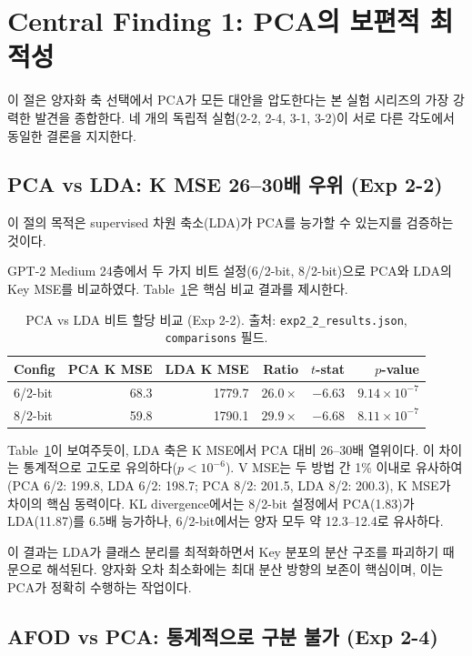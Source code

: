 \documentclass[11pt,a4paper]{article}
\begin{document}
\section{Central Finding 1: PCA의 보편적 최적성}

이 절은 양자화 축 선택에서 PCA가 모든 대안을 압도한다는 본 실험 시리즈의 가장 강력한 발견을 종합한다.
네 개의 독립적 실험(2-2, 2-4, 3-1, 3-2)이 서로 다른 각도에서 동일한 결론을 지지한다.

\subsection{PCA vs LDA: K MSE 26--30배 우위 (Exp 2-2)}
\label{sec:exp22}

이 절의 목적은 supervised 차원 축소(LDA)가 PCA를 능가할 수 있는지를 검증하는 것이다.

GPT-2 Medium 24층에서 두 가지 비트 설정(6/2-bit, 8/2-bit)으로 PCA와 LDA의 Key MSE를 비교하였다.
Table~\ref{tab:exp22_main}은 핵심 비교 결과를 제시한다.

\begin{table}[H]
\centering
\caption{PCA vs LDA 비트 할당 비교 (Exp 2-2). 출처: \texttt{exp2\_2\_results.json}, \texttt{comparisons} 필드.}
\label{tab:exp22_main}
\begin{tabular}{lrrrrr}
\toprule
\textbf{Config} & \textbf{PCA K MSE} & \textbf{LDA K MSE} & \textbf{Ratio} & \textbf{$t$-stat} & \textbf{$p$-value} \\
\midrule
6/2-bit & 68.3 & 1779.7 & $26.0\times$ & $-6.63$ & $9.14 \times 10^{-7}$ \\
8/2-bit & 59.8 & 1790.1 & $29.9\times$ & $-6.68$ & $8.11 \times 10^{-7}$ \\
\bottomrule
\end{tabular}
\end{table}

Table~\ref{tab:exp22_main}이 보여주듯이, LDA 축은 K MSE에서 PCA 대비 26--30배 열위이다.
이 차이는 통계적으로 고도로 유의하다($p < 10^{-6}$).
V MSE는 두 방법 간 1\% 이내로 유사하여(PCA 6/2: 199.8, LDA 6/2: 198.7; PCA 8/2: 201.5, LDA 8/2: 200.3), K MSE가 차이의 핵심 동력이다.
KL divergence에서는 8/2-bit 설정에서 PCA(1.83)가 LDA(11.87)를 6.5배 능가하나, 6/2-bit에서는 양자 모두 약 12.3--12.4로 유사하다.

이 결과는 LDA가 클래스 분리를 최적화하면서 Key 분포의 분산 구조를 파괴하기 때문으로 해석된다.
양자화 오차 최소화에는 최대 분산 방향의 보존이 핵심이며, 이는 PCA가 정확히 수행하는 작업이다.

\subsection{AFOD vs PCA: 통계적으로 구분 불가 (Exp 2-4)}
\label{sec:exp24}
\end{document}

